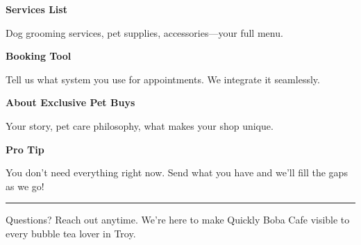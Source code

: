 \documentclass[11pt,letterpaper]{article}
\begin{document}
\begin{minipage}[t]{0.48\textwidth}
\begin{tcolorbox}[colframe=accent-teal, boxrule=1pt, left=0.7em, right=0.7em, top=0.5em, bottom=0.5em, arc=4pt, boxsep=0pt]
{\bfseries\small\color{accent-teal}Services List}

\vspace{0.15em}

{\small Dog grooming services, pet supplies, accessories—your full menu.}
\end{tcolorbox}

\vspace{0.1em}

\begin{tcolorbox}[colframe=accent-teal, boxrule=1pt, left=0.7em, right=0.7em, top=0.5em, bottom=0.5em, arc=4pt, boxsep=0pt]
{\bfseries\small\color{accent-teal}Booking Tool}

\vspace{0.15em}

{\small Tell us what system you use for appointments. We integrate it seamlessly.}
\end{tcolorbox}

\vspace{0.1em}

\begin{tcolorbox}[colframe=accent-teal, boxrule=1pt, left=0.7em, right=0.7em, top=0.5em, bottom=0.5em, arc=4pt, boxsep=0pt]
{\bfseries\small\color{accent-teal}About Exclusive Pet Buys}

\vspace{0.15em}

{\small Your story, pet care philosophy, what makes your shop unique.}
\end{tcolorbox}

\vspace{-0.2em}
\end{minipage}

\vspace{0.15em}

\begin{tcolorbox}[colback={accent-red!5}, colframe=accent-red!20, boxrule=0.5pt, left=0.7em, right=0.7em, top=0.4em, bottom=0.4em, arc=6pt, boxsep=0pt]

{\bfseries\small\color{accent-red}Pro Tip}

\vspace{0.1em}

{\small You don't need everything right now. Send what you have and we'll fill the gaps as we go!}

\end{tcolorbox}

\vspace{0.15em}

\noindent\hrule
\vspace{0.2em}

{\small\color{text-light}Questions? Reach out anytime. We're here to make Quickly Boba Cafe visible to every bubble tea lover in Troy.}
\end{document}
